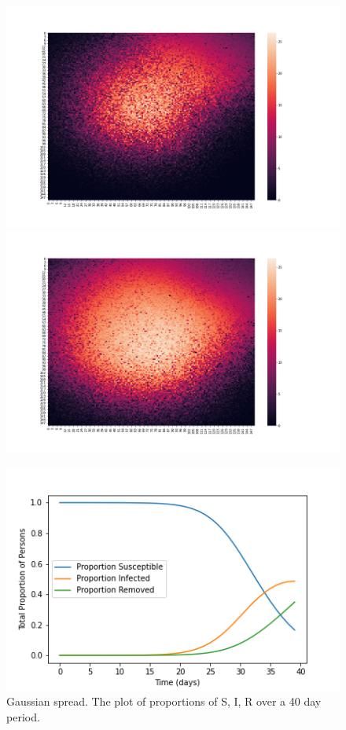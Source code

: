 \documentclass[a4paper]{article}
\begin{document}
\begin{figure}[ht]
  \centering
  \includegraphics[scale=0.14]{../gaussian_spread/gaussian_spread_6.png}
  \centering
  \includegraphics[scale=0.14]{../gaussian_spread/gaussian_spread_7.png}
  \centering
  \centering
\end{figure}
\begin{figure}[ht]
  \includegraphics[scale=0.7]{../gaussian_spread/gauss_plot.png}
  \centering
  \caption{Gaussian spread. The plot of proportions of S, I, R over a 40 day
  period.}
\end{figure}
\end{document}
